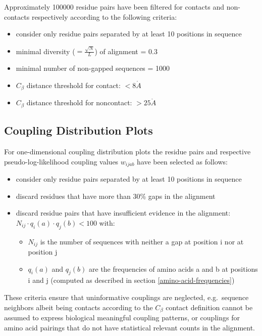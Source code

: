 \documentclass[12pt,a4paper,twoside]{book}
\providecommand{\tightlist}{%
  \setlength{\itemsep}{0pt}\setlength{\parskip}{0pt}}
\newcommand{\Cb}{C_\beta}
\newcommand{\wijab}{w_{ijab}}
\newcommand{\angstrom}{\mathring{A} \;}
\theoremstyle{definition}
\theoremstyle{definition}
\theoremstyle{remark}
\begin{document}
Approximately 100000 residue pairs have been filtered for contacts and
non-contacts respectively according to the following criteria:

\begin{itemize}
\tightlist
\item
  consider only residue pairs separated by at least 10 positions in
  sequence
\item
  minimal diversity (\(=\frac{\sqrt{N}}{L}\)) of alignment = 0.3
\item
  minimal number of non-gapped sequences = 1000
\item
  \(\Cb\) distance threshold for contact: \(<8\angstrom\)
\item
  \(\Cb\) distance threshold for noncontact: \(>25\angstrom\)
\end{itemize}

\subsection{Coupling Distribution Plots}\label{method-coupling-profile}

For one-dimensional coupling distribution plots the residue pairs and
respective pseudo-log-likelihood coupling values \(\wijab\) have been
selected as follows:

\begin{itemize}
\tightlist
\item
  consider only residue pairs separated by at least 10 positions in
  sequence
\item
  discard residues that have more than 30\% gaps in the alignment
\item
  discard residue pairs that have insufficient evidence in the
  alignment: \(N_{ij} \cdot q_i(a) \cdot q_j(b) < 100\) with:

  \begin{itemize}
  \tightlist
  \item
    \(N_{ij}\) is the number of sequences with neither a gap at position
    i nor at position j
  \item
    \(q_i(a)\) and \(q_j(b)\) are the frequencies of amino acids a and b
    at positions i and j (computed as described in section
    \ref{amino-acid-frequencies})
  \end{itemize}
\end{itemize}

These criteria ensure that uninformative couplings are neglected,
e.g.~sequence neighbors albeit being contacts according to the \(\Cb\)
contact definition cannot be assumed to express biological meaningful
coupling patterns, or couplings for amino acid pairings that do not have
statistical relevant counts in the alignment.
\end{document}
